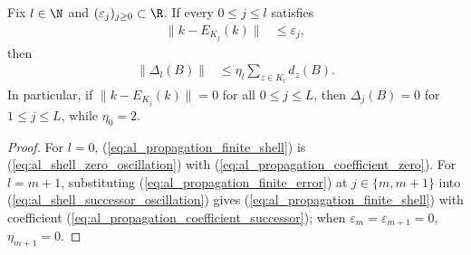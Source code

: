 \begin{lemma}
    \label{thm:al_channel_shell_finite_bound}
    \leanok
    Fix $l\in\N$ and $(\varepsilon_j)_{j\ge0}\subset\R$. If every
    $0\le j\le l$ satisfies
    \begin{align}
        \|k-E_{K_j}(k)\| & \le\varepsilon_j,
        \label{eq:al_propagation_finite_error}
    \end{align}
    then
    \begin{align}
        \|\Delta_l(B)\| & \le\eta_l\sum_{z\in K_l}d_z(B).
        \label{eq:al_propagation_finite_shell}
    \end{align}
    In particular, if $\|k-E_{K_j}(k)\|=0$ for all $0\le j\le L$, then
    $\Delta_j(B)=0$ for $1\le j\le L$, while $\eta_0=2$.
\end{lemma}
\begin{proof}
    \leanok
    For $l=0$, (\ref{eq:al_propagation_finite_shell}) is
    (\ref{eq:al_shell_zero_oscillation}) with
    (\ref{eq:al_propagation_coefficient_zero}). For $l=m+1$, substituting
    (\ref{eq:al_propagation_finite_error}) at $j\in\{m,m+1\}$ into
    (\ref{eq:al_shell_successor_oscillation}) gives
    (\ref{eq:al_propagation_finite_shell}) with coefficient
    (\ref{eq:al_propagation_coefficient_successor}); when
    $\varepsilon_m=\varepsilon_{m+1}=0$, $\eta_{m+1}=0$.
\end{proof}

